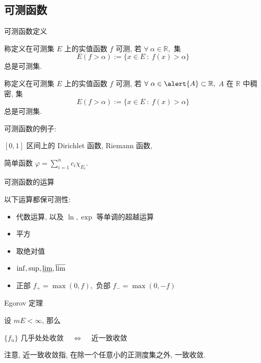 
\subsection[可测函数]{可测函数}


\begin{frame}{可测函数定义}

\begin{Def}[可测函数]
称定义在可测集 $E$ 上的实值函数 $f$ 可测, 若 $\forall ~ \alpha \in \mathbb{R},$ 集
\[
E(f > \alpha) := \{ x \in E ~:~ f(x) > \alpha \}
\]
总是可测集.
\end{Def}

\pause

\begin{Def}
称定义在可测集 $E$ 上的实值函数 $f$ 可测, 若 $\forall ~ \alpha \in \alert{A} \subset \mathbb{R},$ \alert{$A$ 在 $\mathbb{R}$ 中稠密}, 集
\[
E(f > \alpha) := \{ x \in E ~:~ f(x) > \alpha \}
\]
总是可测集.
\end{Def}

\pause

可测函数的例子:

$[0, 1]$ 区间上的 Dirichlet 函数, Riemann 函数,\par
\pause
\alert{简单函数} $\varphi = \sum\limits_{i=1}^n c_i \chi_{E_i}.$

\end{frame}


\begin{frame}{可测函数的运算}

以下运算都保可测性:
\begin{itemize}
\item 代数运算, 以及 $\ln, \exp$ 等单调的超越运算
\item 平方
\item 取绝对值
\item $\inf, \sup, \varliminf, \varlimsup$
\item 正部 $f_+ = \max (0, f),$ 负部 $f_- = \max (0, -f)$
\end{itemize}

\end{frame}


\begin{frame}{Egorov 定理}

\begin{thm}[Egorov 定理]
设 \alert{$m E < \infty$}, 那么
\begin{center}
$\{ f_n \}$ 几乎处处收敛 ~ $\Longleftrightarrow$ ~ \alert{近}一致收敛
\end{center}
\pause
\alert{注意}, 近一致收敛指, 在除一个任意小的正测度集之外, 一致收敛.
\end{thm}

\end{frame}

